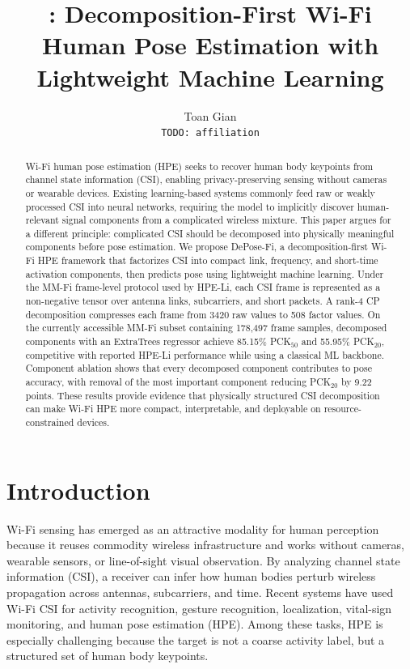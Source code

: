 \documentclass[letterpaper]{article}
\title{\method: Decomposition-First Wi-Fi Human Pose Estimation with Lightweight Machine Learning}
\author{
Toan Gian\\
\texttt{TODO: affiliation}
}
\newcommand{\method}{DePose-Fi}
\begin{document}
\maketitle

\begin{abstract}
Wi-Fi human pose estimation (HPE) seeks to recover human body keypoints from channel state information (CSI), enabling privacy-preserving sensing without cameras or wearable devices. Existing learning-based systems commonly feed raw or weakly processed CSI into neural networks, requiring the model to implicitly discover human-relevant signal components from a complicated wireless mixture. This paper argues for a different principle: complicated CSI should be decomposed into physically meaningful components before pose estimation. We propose \method, a decomposition-first Wi-Fi HPE framework that factorizes CSI into compact link, frequency, and short-time activation components, then predicts pose using lightweight machine learning. Under the MM-Fi frame-level protocol used by HPE-Li, each CSI frame is represented as a non-negative tensor over antenna links, subcarriers, and short packets. A rank-4 CP decomposition compresses each frame from 3420 raw values to 508 factor values. On the currently accessible MM-Fi subset containing 178,497 frame samples, decomposed components with an ExtraTrees regressor achieve 85.15\% PCK$_{50}$ and 55.95\% PCK$_{20}$, competitive with reported HPE-Li performance while using a classical ML backbone. Component ablation shows that every decomposed component contributes to pose accuracy, with removal of the most important component reducing PCK$_{20}$ by 9.22 points. These results provide evidence that physically structured CSI decomposition can make Wi-Fi HPE more compact, interpretable, and deployable on resource-constrained devices.
\end{abstract}

\section{Introduction}

Wi-Fi sensing has emerged as an attractive modality for human perception because it reuses commodity wireless infrastructure and works without cameras, wearable sensors, or line-of-sight visual observation. By analyzing channel state information (CSI), a receiver can infer how human bodies perturb wireless propagation across antennas, subcarriers, and time. Recent systems have used Wi-Fi CSI for activity recognition, gesture recognition, localization, vital-sign monitoring, and human pose estimation (HPE). Among these tasks, HPE is especially challenging because the target is not a coarse activity label, but a structured set of human body keypoints.
\end{document}

